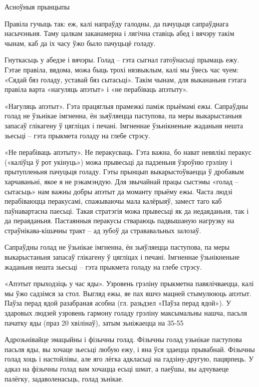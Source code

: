 Асноўныя прынцыпы

Правіла гучыць так: еж, калі напраўду галодны, да пачуцьця сапраўднага насычэньня.
Таму цалкам заканамерна і лягічна ставіць абед і вячэру такім чынам, каб да іх часу ўжо было пачуцьцё голаду.

Гнуткасьць у абедзе і вячэры.
Голад – гэта сыгнал гатоўнасьці прымаць ежу. Гэтае правіла, вядома, можа быць трохі нязвыклым, калі мы ўвесь час чуем: «Сядай бяз голаду, уставай бяз сытасьці». Такім чынам, для выкананьня гэтага правіла варта «нагуляць апэтыт» і «не перабіваць апэтыту».

«Нагуляць апэтыт».
Гэта працяглыя прамежкі паміж прыёмамі ежы. Сапраўдны голад не ўзьнікае імгненна, ён зьяўляецца паступова, па меры выкарыстаньня запасаў глікагену ў цягліцах і печані. Імгненнае ўзьнікненьне жаданьня нешта зьесьці – гэта прыкмета голаду на глебе стрэсу.

«Не перабіваць апэтыту».
Не перакусваць. Гэта важна, бо нават невялікі перакус («каліўца ў рот укінуць») можа прывесьці да падзеньня ўзроўню грэліну і прытупленьня пачуцьця голаду. Гэты прынцып выкарыстоўваецца ў дробавым харчаваньні, якое я не рэкамэндую. Для звычайнай працы сыстэмы «голад – сытасьць» нам важны добры апэтыт да моманту прыёму ежы. Часта людзі перабіваюцца перакусамі, спажываючы мала калёрыяў, замест таго каб паўнавартасна паесьці. Такая стратэгія можа прывесьці як да недаяданьня, так і да пераяданьня. Пастаянныя перакусы ствараюць падвышаную нагрузку на страўнікава-кішачны тракт – ад зубоў да стрававальных залозаў.

Сапраўдны голад не ўзьнікае імгненна, ён зьяўляецца паступова, па меры выкарыстаньня запасаў глікагену ў цягліцах і печані. Імгненнае ўзьнікненьне жаданьня нешта зьесьці – гэта прыкмета голаду на глебе стрэсу.

«Апэтыт прыходзіць у час яды».
Узровень грэліну прыкметна павялічваецца, калі мы ўжо садзімся за стол. Выгляд ежы, яе пах яшчэ мацней стымулююць апэтыт. Паўза перад ядой разабраная асобна (гл. разьдзел «Паўза перад ядой»). У здаровых людзей узровень гармону голаду грэліну максымальны нашча, пасьля пачатку яды (праз 20 хвілінаў), затым зьніжаецца на 35-55%

Адрозьнівайце эмацыйны і фізычны голад.
Фізычны голад узьнікае паступова пасьля яды, вы хочаце зьесьці любую ежу, і яна ўся здаецца прывабнай. Фізычны голад хоць і настойлівы, але яго лёгка адкласьці на гадзіну-другую, пацярпець. У адказ на фізычны голад вам хочацца есьці шмат, а паеўшы, вы адчуваеце палёгку, задаволенасьць, голад зьнікае.

